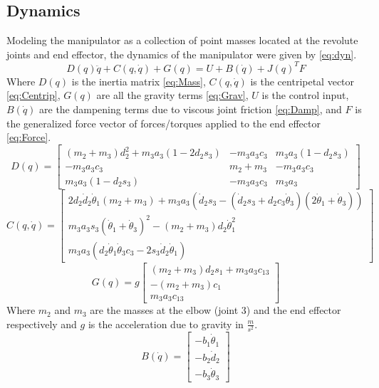 \documentclass[letterpaper,12pt]{report}
\begin{document}
\subsection{Dynamics}
Modeling the manipulator as a collection of point masses located at the revolute joints and end effector,
the dynamics of the manipulator were given by \eqref{eq:dyn}.
\begin{equation} \label{eq:dyn}
D(q)\ddot q + C(q,\dot q) + G(q) = U + B(\dot q) + J(q)^TF
\end{equation}
Where $D(q)$ is the inertia matrix \eqref{eq:Mass}, $C(q,\dot q)$ is the centripetal vector \eqref{eq:Centrip}, $G(q)$ are all the gravity terms 
\eqref{eq:Grav}, $U$ is the control input, $B(\dot q)$ are the dampening terms due to viscous joint friction \eqref{eq:Damp}, and $F$ is the generalized force vector of 
forces/torques applied to the end effector \eqref{eq:Force}.
\begin{equation} \label{eq:Mass}
D(q) = 
	\begin{bmatrix}
		(m_2+m_3)d_2^2+m_3a_3(1-2d_2s_3)&-m_3a_3c_3&m_3a_3(1-d_2s_3)\\
		-m_3a_3c_3&m_2+m_3&-m_3a_3c_3\\
		m_3a_3(1-d_2s_3)&-m_3a_3c_3&m_3a_3
	\end{bmatrix}
\end{equation}
\begin{equation} \label{eq:Centrip}
C(q,\dot q) = 
	\begin{bmatrix}
		2d_2\dot d_2 \dot\theta_1(m_2+m_3) + m_3a_3(\dot d_2s_3-(\dot d_2s_3+d_2c_3\dot\theta_3)(2\dot\theta_1+\dot\theta_3))\\
		m_3a_3s_3(\dot\theta_1+\dot\theta_3)^2 - (m_2+m_3)d_2\dot\theta_1^2\\
		m_3a_3(d_2\dot\theta_1\dot\theta_3c_3 - 2s_3\dot d_2\dot\theta_1)
	\end{bmatrix}
\end{equation}
\begin{equation} \label{eq:Grav}
G(q) = g
	\begin{bmatrix}
		(m_2+m_3)d_2s_1 + m_3a_3c_{13}\\
		-(m_2+m_3)c_1\\
		m_3a_3c_{13}
	\end{bmatrix}
\end{equation}
Where $m_2$ and $m_3$ are the masses at the elbow (joint 3) and the end effector respectively and $g$ is the acceleration due to gravity in $\frac m{s^2}$.
\begin{equation} \label{eq:Damp}
B(\dot q) = 
	\begin{bmatrix}
		-b_1\dot\theta_1\\
		-b_2\dot d_2\\
		-b_3\dot\theta_3
	\end{bmatrix}
\end{equation}
\end{document}
